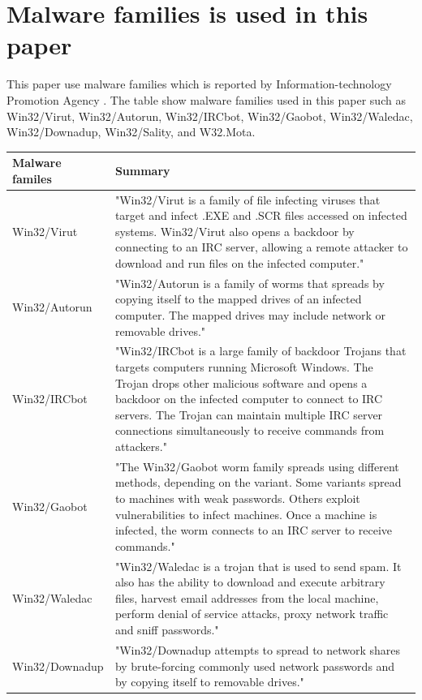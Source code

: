 \section{Malware families is used in this paper} 
This paper use malware families which is reported by Information-technology Promotion Agency \cite{ipa}. The table show malware families used in this paper such as Win32/Virut, Win32/Autorun, Win32/IRCbot, Win32/Gaobot, Win32/Waledac, Win32/Downadup, Win32/Sality, and W32.Mota.

\begin{center}
\begin{table}
\begin{tabular}{ l | p{13cm} }
Malware familes & Summary\\ \hline
Win32/Virut & "Win32/Virut is a family of file infecting viruses that target and infect .EXE and .SCR files accessed on infected systems.
 Win32/Virut also opens a backdoor by connecting to an IRC server, allowing a remote attacker to download and run files on the infected computer." \cite{virut}\\ \hline
Win32/Autorun & "Win32/Autorun is a family of worms that spreads by copying itself to the mapped drives of an infected computer. The mapped drives may include network or removable drives." \cite{autorun}\\\hline
Win32/IRCbot & "Win32/IRCbot is a large family of backdoor Trojans that targets computers running Microsoft Windows. The Trojan drops other malicious software and opens a backdoor on the infected computer to connect to IRC servers. The Trojan can maintain multiple IRC server connections simultaneously to receive commands from attackers." \cite{ircbot}\\ \hline
Win32/Gaobot & "The Win32/Gaobot worm family spreads using different methods, depending on the variant. Some variants spread to machines with weak passwords. Others exploit vulnerabilities to infect machines. Once a machine is infected, the worm connects to an IRC server to receive commands." \cite{gaobot}\\ \hline
Win32/Waledac & "Win32/Waledac is a trojan that is used to send spam. It also has the ability to download and execute arbitrary files, harvest email addresses from the local machine, perform denial of service attacks, proxy network traffic and sniff passwords." \cite{walemac}\\ \hline
Win32/Downadup & "Win32/Downadup attempts to spread to network shares by brute-forcing commonly used network passwords and by copying itself to removable drives." \cite{downadup}\\ \hline 

\end{tabular}
\end{table}
\end{center}
